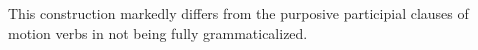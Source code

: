 \documentclass[oneside,a4paper,11pt]{article}
\newcommand{\ipa}[1]{\textit{\phon#1}}
\newcommand{\jpg}[2]{\ipa{#1} `#2'}
\begin{document}
This construction markedly differs from the purposive participial clauses of motion verbs in not being fully grammaticalized.


%
%
%
%
%
\end{document}
